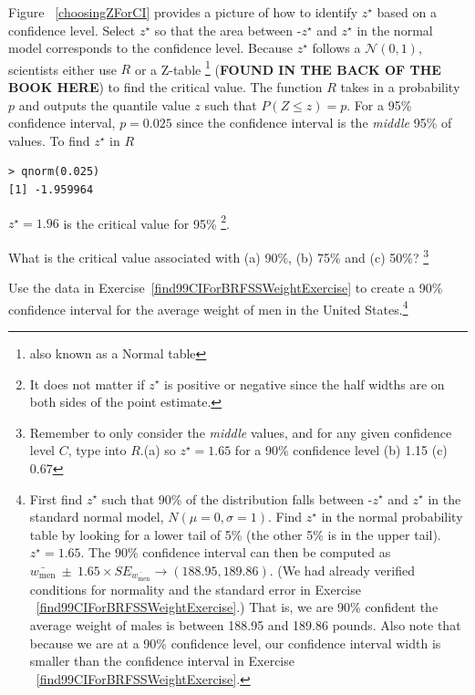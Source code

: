 Figure ~\ref{choosingZForCI} provides a picture of how to identify $z^{\star}$ based on a confidence level. Select $z^{\star}$ so that the area between -$z^{\star}$ and $z^{\star}$ in the normal model corresponds to the confidence level. Because $z^{\star}$ follows a $\mathcal{N}(0,1)$, scientists either use $R$ or a Z-table \footnote{also known as a Normal table} (\textbf{FOUND IN THE BACK OF THE BOOK HERE}) to find the critical value. The  function $R$ takes in a probability $p$ and outputs the quantile value $z$ such that $P(Z\leq z)=p$. For a 95\% confidence interval, $p=0.025$ since the confidence interval is the \emph{middle} 95\% of values. To find $z^{\star}$ in $R$\begin{verbatim}
> qnorm(0.025)
[1] -1.959964
\end{verbatim}
$z^{\star}=1.96$ is the critical value for 95\% \footnote{It does not matter if $z^{\star}$ is positive or negative since the half widths are on both sides of the point estimate.}. 
\begin{exercise} 
What is the critical value associated with (a) 90\%, (b) 75\% and (c) 50\%? \footnote{Remember to only consider the \emph{middle} values, and for any given confidence level $C$, type  into $R$.(a)  so $z^{\star}=1.65$ for a 90\% confidence level (b) 1.15 (c) 0.67}
\end{exercise}

\begin{exercise} \label{find90CIForBRFSSWeightExercise}
Use the data in Exercise~\ref{find99CIForBRFSSWeightExercise} to create a 90\% confidence interval for the average weight of men in the United States.\footnote{First find $z^{\star}$ such that 90\% of the distribution falls between -$z^{\star}$ and $z^{\star}$ in the standard normal model, $N(\mu=0, \sigma=1)$.  Find $z^{\star}$ in the normal probability table by looking for a lower tail of 5\% (the other 5\% is in the upper tail). $z^{\star}=1.65$. The 90\% confidence interval can then be computed as $\bar{w_\mathrm{men}}\ \pm\ 1.65\times SE_{\bar{w_\mathrm{men}}} \to (188.95, 189.86)$.  (We had already verified conditions for normality and the standard error in Exercise ~\ref{find99CIForBRFSSWeightExercise}.) That is, we are 90\% confident the average weight of males is between 188.95 and 189.86 pounds. Also note that because we are at a 90\% confidence level, our confidence interval width is smaller than the confidence interval in Exercise ~\ref{find99CIForBRFSSWeightExercise}.}
\end{exercise}

